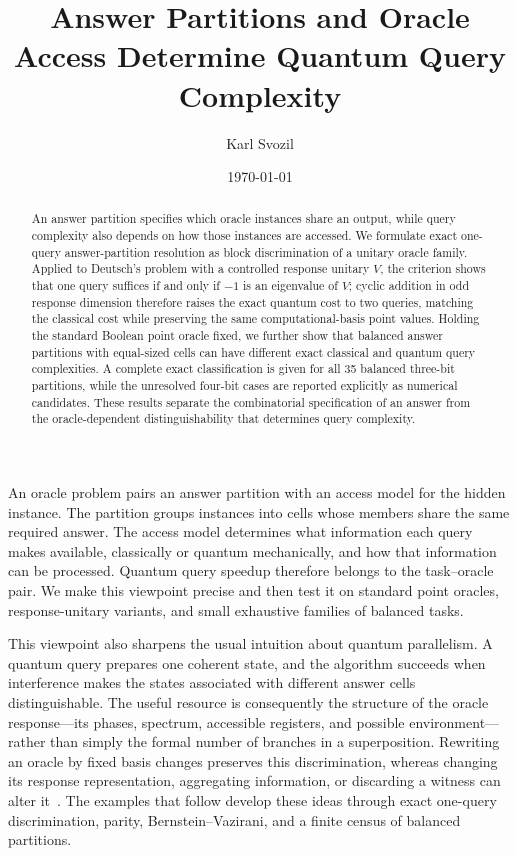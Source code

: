 \documentclass[
  aps,
  prl,
  reprint,
  nofootinbib
]{revtex4-2}
\begin{document}
\title{Answer Partitions and Oracle Access Determine Quantum Query Complexity}

\author{Karl Svozil }

\date{\today}

\begin{abstract}
An answer partition specifies which oracle instances share an output, while
query complexity also depends on how those instances are accessed. We formulate
exact one-query answer-partition resolution as block discrimination of a unitary
oracle family. Applied to Deutsch's problem with a controlled response unitary
\(V\), the criterion shows that one query suffices if and only if \(-1\) is an
eigenvalue of \(V\); cyclic addition in odd response dimension therefore raises
the exact quantum cost to two queries, matching the classical cost while
preserving the same computational-basis point values. Holding the standard
Boolean point oracle fixed, we further show that balanced answer partitions
with equal-sized cells can have different exact classical and quantum query
complexities. A complete exact classification is given for all 35 balanced
three-bit partitions, while the unresolved four-bit cases are reported
explicitly as numerical candidates. These results separate the combinatorial
specification of an answer from the oracle-dependent distinguishability that
determines query complexity.
\end{abstract}

\maketitle

An oracle problem pairs an answer partition with an access model for the hidden
instance. The partition groups instances into cells whose members share the
same required answer. The access model determines what information each query
makes available, classically or quantum mechanically, and how that information
can be processed. Quantum query speedup therefore belongs to the task--oracle
pair. We make this viewpoint precise and then test it on standard point
oracles, response-unitary variants, and small exhaustive families of balanced
tasks.

This viewpoint also sharpens the usual intuition about quantum parallelism. A
quantum query prepares one coherent state, and the algorithm succeeds when
interference makes the states associated with different answer cells
distinguishable. The useful resource is consequently the structure of the
oracle response---its phases, spectrum, accessible registers, and possible
environment---rather than simply the formal number of branches in a
superposition. Rewriting an oracle by fixed basis changes preserves this
discrimination, whereas changing its response representation, aggregating
information, or discarding a witness can alter it~\cite{WojcikChhajlany2006}.
The examples that follow develop these ideas through exact one-query
discrimination, parity, Bernstein--Vazirani, and a finite census of balanced
partitions.
\end{document}
